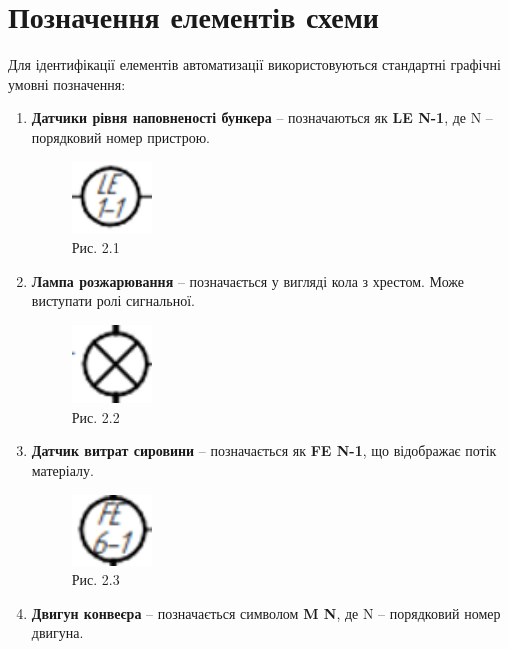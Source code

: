 \documentclass[a4paper]{article}
\begin{document}
\newpage

\section*{Позначення елементів схеми}
Для ідентифікації елементів автоматизації використовуються стандартні графічні умовні позначення:
\begin{enumerate}
    \item \textbf{Датчики рівня наповненості бункера} – позначаються як \textbf{LE N-1}, де N – порядковий номер пристрою.
\begin{figure}[h]
    \centering
    \includegraphics[width=0.2\textwidth]{imgs/PW2.1.png}
    \caption*{Рис. 2.1}
\end{figure} 
    \item \textbf{Лампа розжарювання} – позначається у вигляді кола з хрестом. Може виступати  ролі сигнальної.
\begin{figure}[h]
    \centering
    \includegraphics[width=0.2\textwidth] 
           {imgs/PW2.2.png}
    \caption*{Рис. 2.2}
\end{figure} 
    \item \textbf{Датчик витрат сировини} – позначається як \textbf{FE N-1}, що відображає потік матеріалу.
\begin{figure}[h]
    \centering
    \includegraphics[width=0.2\textwidth] 
           {imgs/PW2.3.png}
    \caption*{Рис. 2.3}
\end{figure} 

\newpage

    \item \textbf{Двигун конвеєра} – позначається символом \textbf{M N}, де N – порядковий номер двигуна.


\end{enumerate}
\end{document}
